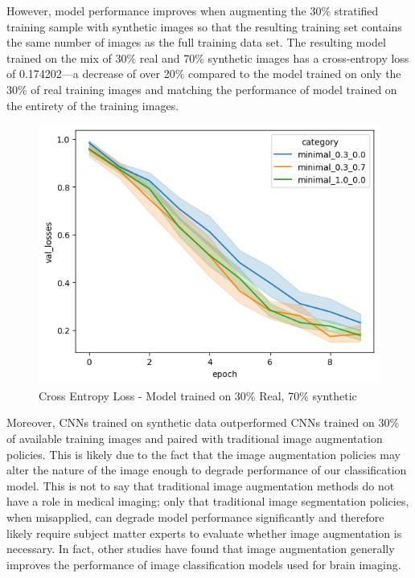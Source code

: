 \documentclass [MS] {uclathes}
\begin{document}
However, model performance improves when augmenting the 30\% stratified training sample with synthetic images so that 
the resulting training set contains the same number of images as the full training data set. The resulting model trained 
on the mix of 30\% real and 70\% synthetic images has a cross-entropy loss of 0.174202---a decrease of over 20\% 
compared to the model trained on only the 30\% of real training images and matching the performance of model trained on 
the entirety of the training images.

\begin{figure}[H]
    \centering
    \includegraphics[width=0.7\linewidth]{figures/cnn_minimal30_result.png}
    \caption{Cross Entropy Loss - Model trained on 30\% Real, 70\% synthetic}
    \label{fig:enter-label}
\end{figure}

Moreover, CNNs trained on synthetic data outperformed CNNs trained on 30\% of available training images and paired with 
traditional image augmentation policies. This is likely due to the fact that the image augmentation policies may alter 
the nature of the image enough to degrade performance of our classification model. This is not to say that traditional 
image augmentation methods do not have a role in medical imaging; only that traditional image segmentation policies, 
when misapplied, can degrade model performance significantly and therefore likely require subject matter experts to 
evaluate whether image augmentation is necessary. In fact, other studies have found that image augmentation generally 
improves the performance of image classification models used for brain imaging. 
\end{document}
